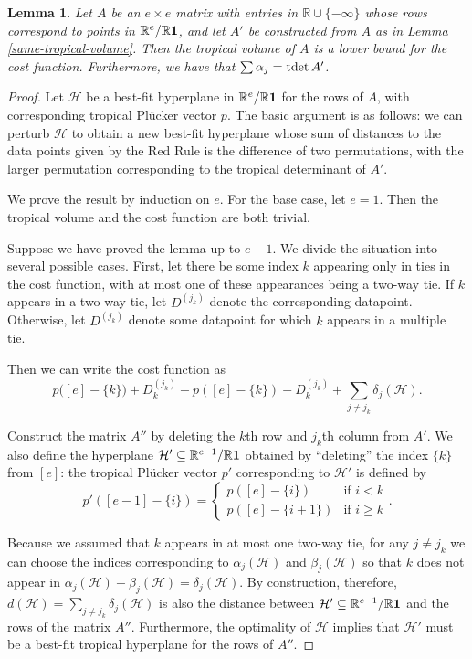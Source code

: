 \documentclass[12pt]{extarticle}
\numberwithin{theorem}{section}
\newtheorem{lemma}[theorem]{Lemma}
\newcommand{\RR}{\mathbb{R}}
\newcommand{\tdet}{\text{tdet\,}}
\begin{document}
\begin{lemma}\label{lower-bound}
Let $A$ be an $e\times e$ matrix with entries in $\mathbb R\cup\{-\infty\}$ whose rows correspond to points in $\RR^e/\RR {\bf 1}$, and let $A'$ be constructed from $A$ as in Lemma \ref{same-tropical-volume}. Then the tropical volume of $A$ is a lower bound for the cost function. Furthermore, we have that $\sum {\alpha_j}=\tdet A'$.
\end{lemma}
\begin{proof}
Let $\mathcal H$ be a best-fit hyperplane in $\RR^e/\RR {\bf 1}$ for the rows of $A$, with corresponding tropical Pl\"ucker vector $p$. The basic argument is as follows: we can perturb $\mathcal H$ to obtain a new best-fit hyperplane whose sum of distances to the data points given by the Red Rule is the difference of two permutations, with the larger permutation corresponding to the tropical determinant of $A'$.

We prove the result by induction on $e$. For the base case, let $e = 1$. Then the tropical volume and the cost function are both trivial.

Suppose we have proved the lemma up to $e-1$. We divide the situation into several possible cases. First, let there be some index $k$ appearing only in ties in the cost function, with at most one of these appearances being a two-way tie. If $k$ appears in a two-way tie, let $D^{(j_k)}$ denote the corresponding datapoint. Otherwise, let $D^{(j_k)}$ denote some datapoint for which $k$ appears in a multiple tie. 

Then we can write the cost function as
\[p({[e]-\{k\})} + D^{(j_k)}_k - p({[e]-\{k\}}) - D^{(j_k)}_k + \sum_{j\neq j_k} \delta_j(\mathcal H).\]

Construct the matrix $A''$ by deleting the $k$th row and $j_k$th column from $A'$. We also define the hyperplane $\mathcal H'\subseteq \RR^{e-1}/\RR {\bf 1}$ obtained by ``deleting'' the index $\{k\}$ from $[e]$: the tropical Pl\"ucker vector $p'$ corresponding to $\mathcal H'$ is defined by
\[p'([e-1]-\{i\}) = \begin{cases} p([e]-\{i\}) & \mbox{if }i<k\\ p([e] - \{i+1\}) & \mbox{if } i\geq k\end{cases}.\] 

Because we assumed that $k$ appears in at most one two-way tie, for any $j\neq j_k$ we can choose the indices corresponding to $\alpha_j(\mathcal H)$ and $\beta_j(\mathcal H)$ so that $k$ does not appear in $\alpha_j(\mathcal H)-\beta_j(\mathcal H)=\delta_j(\mathcal H)$. By construction, therefore, $d(\mathcal H) = \sum_{j\neq j_k} \delta_j(\mathcal H)$ is also the distance between $\mathcal H'\subseteq \RR^{e-1}/\RR {\bf 1}$ and the rows of the matrix $A''$. Furthermore, the optimality of $\mathcal H$ implies that $\mathcal H'$ must be a best-fit tropical hyperplane for the rows of $A''$.


\end{proof}
\end{document}
